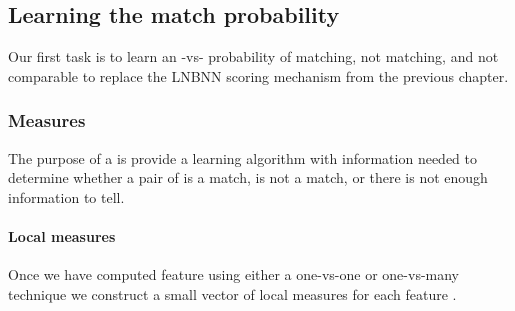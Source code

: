     \subsection{Learning the match probability}
        Our first task is to learn an \annot{}-vs-\annot{} probability of matching, not matching, and not comparable
          to replace the LNBNN scoring mechanism from the previous chapter.
        
        \subsubsection{Measures}
            The purpose of a \matchvec{} is provide a learning algorithm with information needed to determine whether
              a pair of \annots{} is a match, is not a match, or there is not enough information to tell.
            
            \paragraph{Local measures}
            Once we have computed feature \correspondences{} using either a one-vs-one or one-vs-many technique we
              construct a small vector of local measures for each feature \correspondence{}.
            
